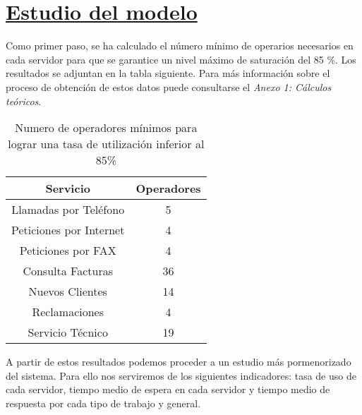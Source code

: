 \section{\textbf{\underline{Estudio del modelo}}}
Como primer paso, se ha calculado el número mínimo de operarios necesarios en cada servidor para que se garantice un nivel máximo de saturación del 85 \%. Los resultados se adjuntan en la tabla siguiente. Para más información sobre el proceso de obtención de estos datos puede consultarse el \textit{Anexo 1: Cálculos teóricos}.
\begin{table}[H]
  \begin{center}
  \begin{tabular}{|c|c|}
    \hline
    \textbf{Servicio}       & \textbf{Operadores} \\ \hline
    Llamadas por Teléfono   & 5                   \\ \hline
    Peticiones por Internet & 4                   \\ \hline
    Peticiones por FAX      & 4                   \\ \hline
    Consulta Facturas      & 36                   \\ \hline
    Nuevos Clientes      & 14                   \\ \hline
    Reclamaciones      & 4                   \\ \hline
    Servicio Técnico      & 19                   \\ \hline
  \end{tabular}
\end{center}
  \caption{Numero de operadores mínimos para lograr una tasa de utilización inferior al 85\%}
\end{table}
A partir de estos resultados podemos proceder a un estudio más pormenorizado del sistema. Para ello nos serviremos de los siguientes indicadores: tasa de uso de cada servidor, tiempo medio de espera en cada servidor y tiempo medio de respuesta por cada tipo de trabajo y general.
